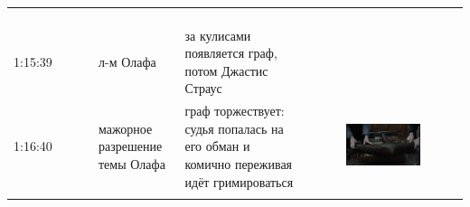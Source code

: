 \begin{longtable}[]{@{}llll@{}}
\begin{minipage}[t]{0.27\columnwidth}
\begin{figure}
\caption{}
\end{figure}
\strut
\end{minipage}\tabularnewline
\begin{minipage}[t]{0.15\columnwidth}\raggedright\strut
1:15:39\strut
\end{minipage} & \begin{minipage}[t]{0.20\columnwidth}\raggedright\strut
л-м Олафа\strut
\end{minipage} & \begin{minipage}[t]{0.27\columnwidth}\raggedright\strut
за кулисами появляется граф,
потом Джастис Страус\strut
\end{minipage} & \begin{minipage}[t]{0.27\columnwidth}\raggedright\strut
\strut
\end{minipage}\tabularnewline
\begin{minipage}[t]{0.15\columnwidth}\raggedright\strut
1:16:40\strut
\end{minipage} & \begin{minipage}[t]{0.20\columnwidth}\raggedright\strut
мажорное разрешение
темы Олафа\strut
\end{minipage} & \begin{minipage}[t]{0.27\columnwidth}\raggedright\strut
граф торжествует: судья
попалась на его обман и
комично переживая идёт
гримироваться\strut
\end{minipage} & \begin{minipage}[t]{0.27\columnwidth}\raggedright\strut
\begin{figure}
\centering
\includegraphics{IMG/LS_HH_fugato.png}
\caption{}
\end{figure}
\strut
\end{minipage}\tabularnewline
\begin{minipage}[t]{0.15\columnwidth}\raggedright\strut

\end{minipage}
\end{longtable}
